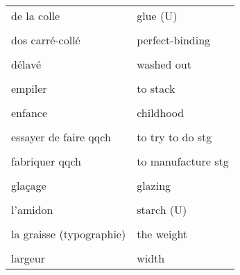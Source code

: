 \documentclass[
  10pt,
]{article}
\begin{document}
\begin{longtable}{ll}
de la colle & glue (U)\\

\cellcolor{gray!6}{dorure à chaud} & \cellcolor{gray!6}{hot foil stamping}\\

dos carré-collé & perfect-binding\\

\cellcolor{gray!6}{décrire} & \cellcolor{gray!6}{to describe}\\

délavé & washed out\\

\cellcolor{gray!6}{dépenser (ou passer du temps)} & \cellcolor{gray!6}{to spend}\\

empiler & to stack\\

\cellcolor{gray!6}{encre} & \cellcolor{gray!6}{ink}\\

enfance & childhood\\

\cellcolor{gray!6}{enlever} & \cellcolor{gray!6}{to remove}\\

essayer de faire qqch & to try to do stg\\

\cellcolor{gray!6}{expédier qqch} & \cellcolor{gray!6}{to ship out stg}\\

fabriquer qqch & to manufacture stg\\

\cellcolor{gray!6}{faire du télétravail} & \cellcolor{gray!6}{to work from home}\\

glaçage & glazing\\

\cellcolor{gray!6}{hauteur} & \cellcolor{gray!6}{height}\\

l'amidon & starch (U)\\

\cellcolor{gray!6}{la couverture} & \cellcolor{gray!6}{the cover}\\

la graisse (typographie) & the weight\\

\cellcolor{gray!6}{la rogne} & \cellcolor{gray!6}{cut-offs}\\

largeur & width\\


\end{longtable}
\end{document}
